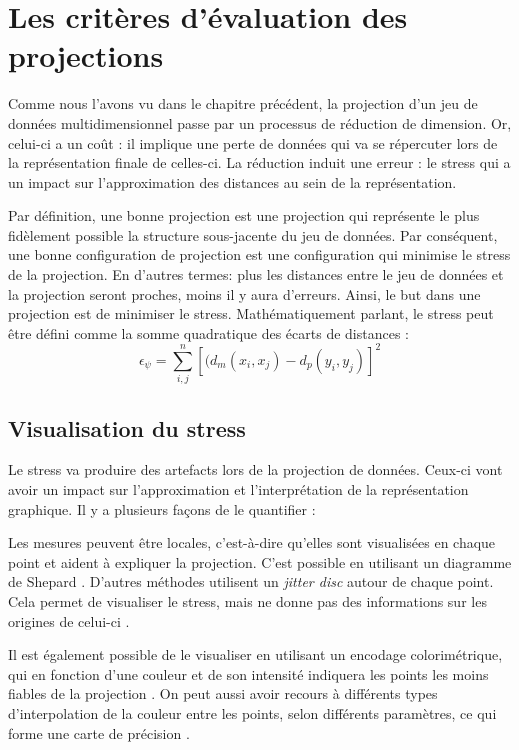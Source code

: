 \section{Les critères d'évaluation des projections}

Comme nous l’avons vu dans le chapitre précédent, la projection d'un jeu de données multidimensionnel passe par un processus de réduction de dimension. 
Or, celui-ci a un coût : il implique une perte de données qui va se répercuter lors de la représentation finale de celles-ci.\smallskip
La réduction induit une erreur : le stress qui a un impact sur l’approximation des distances au sein de la représentation.

Par définition, une bonne projection est une projection qui représente le plus fidèlement
possible la structure sous-jacente du jeu de données. Par conséquent, une
bonne configuration de projection est une configuration qui minimise le stress de la
projection. En d'autres termes: plus les distances entre le jeu de données et la projection seront proches, moins il y aura d’erreurs.
Ainsi, le but dans une projection est de minimiser le stress. \newline 
Mathématiquement parlant, le stress peut être défini comme la somme
quadratique des écarts de distances :  \[\epsilon_\psi = \sum_{i,j}^{n}[(d_m (x_i , x_j )- d_p (y_i ,y_j )]^{2} \] 


\subsection{Visualisation du stress}

Le stress va produire des artefacts lors de la projection de données. Ceux-ci vont
avoir un impact sur l’approximation et l'interprétation de la représentation graphique. Il y a
plusieurs façons de le quantifier :

Les mesures peuvent être locales, c'est-à-dire qu'elles sont visualisées en chaque point et aident à expliquer
la projection. C’est possible en utilisant un diagramme de Shepard \cite{kruskal1964multidimensional} \cite{HeulotThese}.
D'autres méthodes utilisent un \textit{jitter disc} autour de chaque point. Cela permet de visualiser le
stress, mais ne donne pas des informations sur les origines de celui-ci \cite{HeulotAnEvaluation}.

Il est également possible de le visualiser en utilisant un encodage colorimétrique, qui en
fonction d’une couleur et de son intensité indiquera les points les moins fiables de la
projection \cite{CheckViz}.
On peut aussi avoir recours à différents types d’interpolation de la couleur entre les points,
selon différents paramètres, ce qui forme une carte de précision \cite{schreck2010techniques}.
\smallskip

